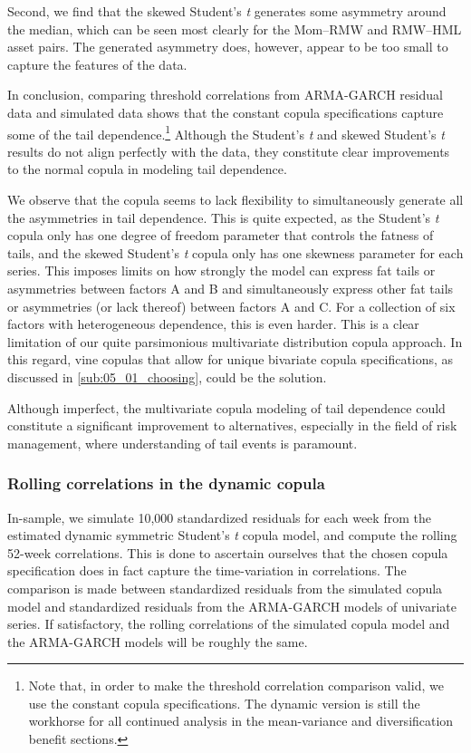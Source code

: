 Second, we find that the skewed Student's \textit{t} generates some asymmetry around the median, which can be seen most clearly for the Mom--RMW and RMW--HML asset pairs. The generated asymmetry does, however, appear to be too small to capture the features of the data.

In conclusion, comparing threshold correlations from ARMA-GARCH residual data and simulated data shows that the constant copula specifications capture some of the tail dependence.\footnote{Note that, in order to make the threshold correlation comparison valid, we use the constant copula specifications. The dynamic version is still the workhorse for all continued analysis in the mean-variance and diversification benefit sections.} Although the Student's \textit{t} and skewed Student's \textit{t} results do not align perfectly with the data, they constitute clear improvements to the normal copula in modeling tail dependence. 

We observe that the copula seems to lack flexibility to simultaneously generate all the asymmetries in tail dependence. This is quite expected, as the Student's \textit{t} copula only has one degree of freedom parameter that controls the fatness of tails, and the skewed Student's \textit{t} copula only has one skewness parameter for each series. This imposes limits on how strongly the model can express fat tails or asymmetries between factors A and B and simultaneously express other fat tails or asymmetries (or lack thereof) between factors A and C. For a collection of six factors with heterogeneous dependence, this is even harder. This is a clear limitation of our quite parsimonious multivariate distribution copula approach. In this regard, vine copulas that allow for unique bivariate copula specifications, as discussed in \autoref{sub:05_01_choosing}, could be the solution.

Although imperfect, the multivariate copula modeling of tail dependence could constitute a significant improvement to alternatives, especially in the field of risk management, where understanding of tail events is paramount.

\subsubsection{Rolling correlations in the dynamic copula}

In-sample, we simulate 10,000 standardized residuals for each week from the estimated dynamic symmetric Student's \textit{t} copula model, and compute the rolling 52-week correlations. This is done to ascertain ourselves that the chosen copula specification does in fact capture the time-variation in correlations. The comparison is made between standardized residuals from the simulated copula model and standardized residuals from the ARMA-GARCH models of univariate series. If satisfactory, the rolling correlations of the simulated copula model and the ARMA-GARCH models will be roughly the same.

